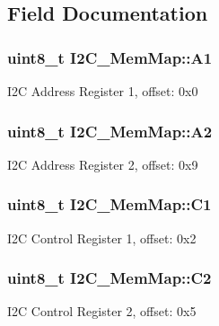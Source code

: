 \subsection{Field Documentation}
\hypertarget{struct_i2_c___mem_map_aefc602e5555ff9807f66ba8d67c214c0}{}
\subsubsection[{A1}]{\setlength{\rightskip}{0pt plus 5cm}uint8\+\_\+t I2\+C\+\_\+\+Mem\+Map\+::\+A1}\label{struct_i2_c___mem_map_aefc602e5555ff9807f66ba8d67c214c0}
I2\+C Address Register 1, offset\+: 0x0 \hypertarget{struct_i2_c___mem_map_ad4e4dbcd884a2b52af7dbef17817f12e}{}
\subsubsection[{A2}]{\setlength{\rightskip}{0pt plus 5cm}uint8\+\_\+t I2\+C\+\_\+\+Mem\+Map\+::\+A2}\label{struct_i2_c___mem_map_ad4e4dbcd884a2b52af7dbef17817f12e}
I2\+C Address Register 2, offset\+: 0x9 \hypertarget{struct_i2_c___mem_map_a211af10ff66759da8bd2712f3d26ad8a}{}
\subsubsection[{C1}]{\setlength{\rightskip}{0pt plus 5cm}uint8\+\_\+t I2\+C\+\_\+\+Mem\+Map\+::\+C1}\label{struct_i2_c___mem_map_a211af10ff66759da8bd2712f3d26ad8a}
I2\+C Control Register 1, offset\+: 0x2 \hypertarget{struct_i2_c___mem_map_a5e8189de70defa55b4d4d50e42ac88d1}{}
\subsubsection[{C2}]{\setlength{\rightskip}{0pt plus 5cm}uint8\+\_\+t I2\+C\+\_\+\+Mem\+Map\+::\+C2}\label{struct_i2_c___mem_map_a5e8189de70defa55b4d4d50e42ac88d1}
I2\+C Control Register 2, offset\+: 0x5 \hypertarget{struct_i2_c___mem_map_a44f0a2e82a172b16e1241939185790cf}{}
